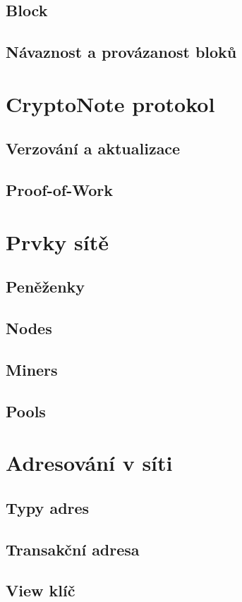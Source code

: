 \documentclass[
  printed, %
  table,   %
  nolof,     %
  nolot,     %
           oneside, color
]{fithesis3}
\begin{document}
\subsection{Block}
\subsection{Návaznost a provázanost bloků}
\section{CryptoNote protokol}
\subsection{Verzování a aktualizace}
\subsection{Proof-of-Work}
\section{Prvky sítě}
\subsection{Peněženky}
\subsection{Nodes}
\subsection{Miners}
\subsection{Pools}
\section{Adresování v síti}
\subsection{Typy adres}
\subsection{Transakční adresa}
\subsection{View klíč}
\end{document}
